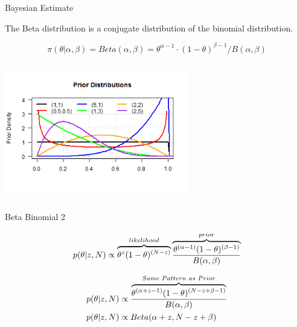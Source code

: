 \documentclass[
  ignorenonframetext,
]{beamer}
\begin{document}
\begin{frame}{Bayesian Estimate}
\protect\hypertarget{bayesian-estimate}{}

The Beta distribution is a conjugate distribution of the binomial
distribution.

\[
\pi(\theta | \alpha, \beta) = Beta(\alpha, \beta) = \theta^{\alpha-1} \cdot (1-\theta)^{\beta-1}/B(\alpha, \beta)
\]

\begin{center}\includegraphics[width=8cm,height=6cm]{figures/BetaPriors} \end{center}

\end{frame}

\begin{frame}{Beta Binomial 2}
\protect\hypertarget{beta-binomial-2}{}

\begin{equation}
p(\theta|z,N) \propto \overbrace{\theta^z(1-\theta)^{(N-z)}}^{likelihood} \overbrace{{\theta^{(\alpha-1)}(1-\theta)^{(\beta-1)}}\over B(\alpha,\beta)}^{prior}
\end{equation}

\begin{equation}
\begin{aligned}
p(\theta|z,N) &\propto {\overbrace{\theta^{(\alpha + z -1)}(1-\theta)^{(N-z+\beta-1)}}^{Same \hspace{1 mm} Pattern \hspace{1 mm} as \hspace{1 mm} Prior}\over{B(\alpha,\beta)}}\\
p(\theta|z,N) &\propto Beta(\alpha+z, N-z+\beta)
\end{aligned}
\end{equation}

\end{frame}
\end{document}
